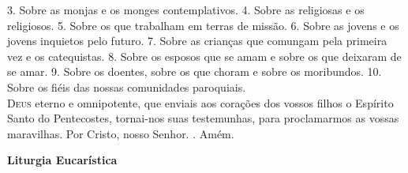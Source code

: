 \documentclass{book}
\begin{document}
\begin{flushleft}
    \newline
    {\color{VioletRed2} 3.} Sobre as monjas e os monges contemplativos.
    \vspace{.2cm}
    \newline
    {\color{VioletRed2} 4.} Sobre as religiosas e os religiosos.
    \vspace{.2cm}
    \newline
    {\color{VioletRed2} 5.} Sobre os que trabalham em terras de missão.
    \vspace{.2cm}
    \newline
    {\color{VioletRed2} 6.} Sobre as jovens e os jovens inquietos pelo futuro.
    \vspace{.2cm}
    \newline
    {\color{VioletRed2} 7.} Sobre as crianças que comungam pela primeira vez e os catequistas.
    \vspace{.2cm}
    \newline
    {\color{VioletRed2} 8.} Sobre os esposos que se amam e sobre os que deixaram de se amar.
    \vspace{.2cm}
    \newline
    {\color{VioletRed2} 9.} Sobre os doentes, sobre os que choram e sobre os moribundos.
    \vspace{.2cm}
    \newline
    {\color{VioletRed2} 10.} Sobre os fiéis das nossas comunidades paroquiais.
    \vspace{.2cm} \\
    \lettrine[findent=2pt]{\color{VioletRed2}D}{eus} eterno e omnipotente,
    \newline
    que enviais aos corações dos vossos filhos
    \newline
    o Espírito Santo do Pentecostes,
    \newline
    tornai-nos suas testemunhas,
    \newline
    para proclamarmos as vossas maravilhas.
    \newline
    Por Cristo, nosso Senhor.
    \newline
    {\color{VioletRed2} \Rbar.} Amém.
\end{flushleft}
\begin{center}
    \textbf{Liturgia Eucarística}
\end{center}
\end{document}
